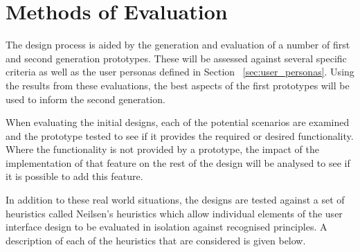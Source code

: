 \section{Methods of Evaluation}
\label{sec:methods_of_evaluation}

The design process is aided by the generation and evaluation of a number of
first and second generation prototypes. These will be assessed against several
specific criteria as well as the user personas defined in Section~%
\ref{sec:user_personas}. Using the results from these evaluations, the
best aspects of the first prototypes will be used to inform the second
generation.

When evaluating the initial designs, each of the potential scenarios are
examined and the prototype tested to see if it provides the required or desired
functionality. Where the functionality is not provided by a prototype, the
impact of the implementation of that feature on the rest of the design will be
analysed to see if it is possible to add this feature.

In addition to these real world situations, the designs are tested against a
set of heuristics called Neilsen's heuristics\cite{nielsonheuristics} which
allow individual elements of the user interface design to be evaluated in
isolation against recognised principles. A description of each of the
heuristics that are considered is given below.


